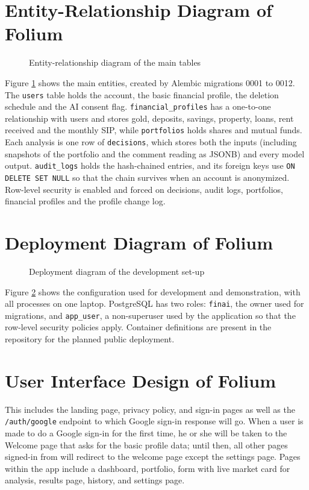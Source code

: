 \section{Entity-Relationship Diagram of Folium}
\begin{figure}[H]
\centering
\resizebox{0.95\textwidth}{!}{}
\caption{Entity-relationship diagram of the main tables}
\label{fig:er}
\end{figure}

Figure \ref{fig:er} shows the main entities, created by Alembic migrations 0001 to 0012. The \texttt{users} table holds the account, the basic financial profile, the deletion schedule and the AI consent flag. \texttt{financial\_profiles} has a one-to-one relationship with users and stores gold, deposits, savings, property, loans, rent received and the monthly SIP, while \texttt{portfolios} holds shares and mutual funds. Each analysis is one row of \texttt{decisions}, which stores both the inputs (including snapshots of the portfolio and the comment reading as JSONB) and every model output. \texttt{audit\_logs} holds the hash-chained entries, and its foreign keys use \texttt{ON DELETE SET NULL} so that the chain survives when an account is anonymized. Row-level security is enabled and forced on decisions, audit logs, portfolios, financial profiles and the profile change log.

\section{Deployment Diagram of Folium}
\begin{figure}[H]
\centering
\resizebox{0.9\textwidth}{!}{}
\caption{Deployment diagram of the development set-up}
\label{fig:deploy}
\end{figure}

Figure \ref{fig:deploy} shows the configuration used for development and demonstration, with all processes on one laptop. PostgreSQL has two roles: \texttt{finai}, the owner used for migrations, and \texttt{app\_user}, a non-superuser used by the application so that the row-level security policies apply. Container definitions are present in the repository for the planned public deployment.

\section{User Interface Design of Folium}
This includes the landing page, privacy policy, and sign-in pages as well as the \texttt{/auth/google} endpoint to which Google sign-in response will go. When a user is made to do a Google sign-in for the first time, he or she will be taken to the Welcome page that asks for the basic profile data; until then, all other pages signed-in from will redirect to the welcome page except the settings page. Pages within the app include a dashboard, portfolio, form with live market card for analysis, results page, history, and settings page.

